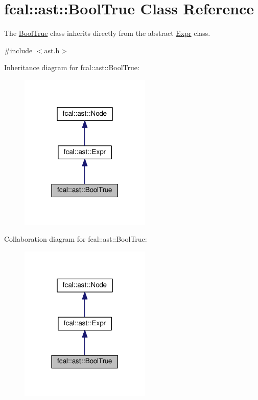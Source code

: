 \hypertarget{classfcal_1_1ast_1_1BoolTrue}{}\section{fcal\+:\+:ast\+:\+:Bool\+True Class Reference}
\label{classfcal_1_1ast_1_1BoolTrue}


The \hyperlink{classfcal_1_1ast_1_1BoolTrue}{Bool\+True} class inherits directly from the abstract \hyperlink{classfcal_1_1ast_1_1Expr}{Expr} class.  




{\ttfamily \#include $<$ast.\+h$>$}



Inheritance diagram for fcal\+:\+:ast\+:\+:Bool\+True\+:
\nopagebreak
\begin{figure}[H]
\begin{center}
\leavevmode
\includegraphics[width=177pt]{classfcal_1_1ast_1_1BoolTrue__inherit__graph}
\end{center}
\end{figure}


Collaboration diagram for fcal\+:\+:ast\+:\+:Bool\+True\+:
\nopagebreak
\begin{figure}[H]
\begin{center}
\leavevmode
\includegraphics[width=177pt]{classfcal_1_1ast_1_1BoolTrue__coll__graph}
\end{center}
\end{figure}
